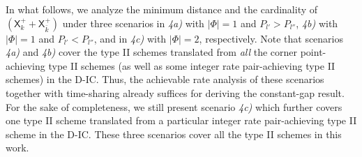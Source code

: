 \documentclass[12pt, draftclsnofoot, onecolumn]{IEEEtran}
\newcommand{\msf}[1]{\mathsf{#1}}
\theoremstyle{definition}
\begin{document}
In what follows, we analyze the minimum distance and the cardinality of $(\msf{X}^{+}_k+\msf{X}^{+}_{\bar{k}})$ under three scenarios in \emph{4a)} with $|\Phi|=1$ and $P_{l'}>P_{l''}$, \emph{4b)} with $|\Phi|=1$ and $P_{l'}<P_{l''}$, and in \emph{4c)} with $|\Phi|=2$, respectively. Note that scenarios \emph{4a)} and \emph{4b)} cover the type II schemes translated from \emph{all} the corner point-achieving type II schemes (as well as some integer rate pair-achieving type II schemes) in the D-IC. Thus, the achievable rate analysis of these scenarios together with time-sharing already suffices for deriving the constant-gap result. For the sake of completeness, we still present scenario \emph{4c)} which further covers one type II scheme translated from a particular integer rate pair-achieving type II scheme in the D-IC. These three scenarios cover all the type II schemes in this work.






\end{document}
